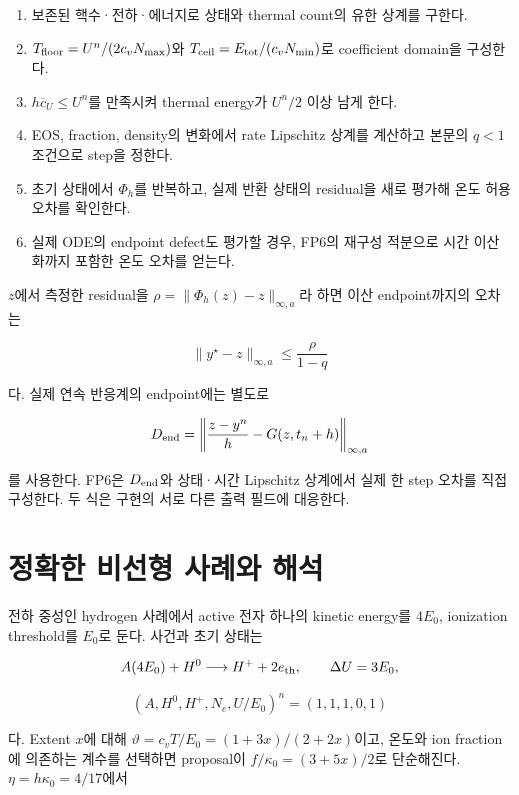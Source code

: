 \begin{enumerate}
\def\labelenumi{\arabic{enumi}.}
\tightlist
\item
  보존된 핵수·전하·에너지로 상태와 thermal count의 유한 상계를 구한다.
\item
  \(T_{\rm floor}=U^n/(2c_vN_{\max})\)와 \(T_{\rm ceil}=E_{\rm tot}/(c_vN_{\min})\)로 coefficient domain을 구성한다.
\item
  \(h\overline c_U\le U^n\)를 만족시켜 thermal energy가 \(U^n/2\) 이상 남게 한다.
\item
  EOS, fraction, density의 변화에서 rate Lipschitz 상계를 계산하고 본문의 \(q<1\) 조건으로 step을 정한다.
\item
  초기 상태에서 \(\Phi_h\)를 반복하고, 실제 반환 상태의 residual을 새로 평가해 온도 허용오차를 확인한다.
\item
  실제 ODE의 endpoint defect도 평가할 경우, FP6의 재구성 적분으로 시간 이산화까지 포함한 온도 오차를 얻는다.
\end{enumerate}

\(z\)에서 측정한 residual을 \(\rho=\|\Phi_h(z)-z\|_{\infty,a}\)라 하면 이산 endpoint까지의 오차는

\[
\|y^\star-z\|_{\infty,a}\le\frac{\rho}{1-q}
\]

다. 실제 연속 반응계의 endpoint에는 별도로

\[
D_{\rm end}
=\left\|\frac{z-y^n}{h}-G(z,t_n+h)\right\|_{\infty,a}
\]

를 사용한다. FP6은 \(D_{\rm end}\)와 상태·시간 Lipschitz 상계에서 실제 한 step 오차를 직접 구성한다. 두 식은 구현의 서로 다른 출력 필드에 대응한다.

\hypertarget{uxc815uxd655uxd55c-uxbe44uxc120uxd615-uxc0acuxb840uxc640-uxd574uxc11d}{%
\section{정확한 비선형 사례와 해석}\label{uxc815uxd655uxd55c-uxbe44uxc120uxd615-uxc0acuxb840uxc640-uxd574uxc11d}}

전하 중성인 hydrogen 사례에서 active 전자 하나의 kinetic energy를 \(4E_0\), ionization threshold를 \(E_0\)로 둔다. 사건과 초기 상태는

\[
A(4E_0)+H^0\longrightarrow H^++2e_{\rm th},
\qquad \Delta U=3E_0,
\]

\[
(A,H^0,H^+,N_e,U/E_0)^n=(1,1,1,0,1)
\]

다. Extent \(x\)에 대해 \(\vartheta=c_vT/E_0=(1+3x)/(2+2x)\)이고, 온도와 ion fraction에 의존하는 계수를 선택하면 proposal이 \(f/\kappa_0=(3+5x)/2\)로 단순해진다. \(\eta=h\kappa_0=4/17\)에서

